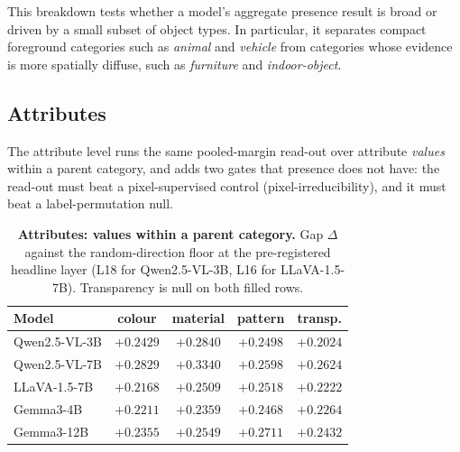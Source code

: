 This breakdown tests whether a model's aggregate presence result is broad or
driven by a small subset of object types. In particular, it separates compact
foreground categories such as \emph{animal} and \emph{vehicle} from categories
whose evidence is more spatially diffuse, such as \emph{furniture} and
\emph{indoor-object}.


\subsection{Attributes}
\label{sec:exp_attributes}

The attribute level runs the same pooled-margin read-out over attribute
\emph{values} within a parent category, and adds two gates that presence does
not have: the read-out must beat a pixel-supervised control
(pixel-irreducibility), and it must beat a label-permutation null.

\begin{table}[t]
    \centering
    \footnotesize
    \setlength{\tabcolsep}{4pt}
    \begin{tabular}{lcccc}
        \toprule
        Model & colour & material & pattern & transp. \\
        \midrule
        Qwen2.5-VL-3B & $+0.2429$            & $+0.2840$ & $+0.2498$ & $+0.2024$ \\
        Qwen2.5-VL-7B & $+0.2829$            & $+0.3340$ & $+0.2598$ & $+0.2624$  \\
        LLaVA-1.5-7B  & $+0.2168$  & $+0.2509$ & $+0.2518$ & $+0.2222$ \\
        Gemma3-4B     & $+0.2211$  & $+0.2359$ & $+0.2468$ & $+0.2264$     \\
        Gemma3-12B    & $+0.2355$  & $+0.2549$ & $+0.2711$ & $+0.2432$      \\
        \bottomrule
    \end{tabular}
    \caption{\textbf{Attributes: values within a parent category.} Gap
        $\Delta$ against the random-direction floor at the pre-registered
        headline layer (L18 for Qwen2.5-VL-3B, L16 for LLaVA-1.5-7B).
        Transparency is null on both filled rows. }
    \label{tab:attributes}
\end{table}

